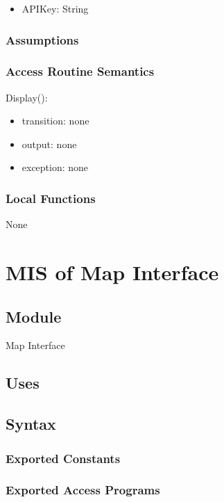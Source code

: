 \documentclass[12pt, titlepage]{article}
\begin{document}
\begin{itemize}
\begin{itemize}
\item APIKey: String
\end{itemize}

\subsubsection{Assumptions}

\subsubsection{Access Routine Semantics}

\noindent Display():
\begin{itemize}
\item transition: none
\item output: none
\item exception: none
\end{itemize}

\subsubsection{Local Functions}

None

\newpage

\section{MIS of Map Interface} \label{mMapInterface}

\subsection{Module}

Map Interface

\subsection{Uses}

\subsection{Syntax}

\subsubsection{Exported Constants}

\subsubsection{Exported Access Programs}


\end{itemize}
\end{document}
